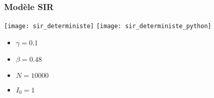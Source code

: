 \begin{frame}
        \frametitle{Modèle SIR}

		\centering

		\texttt{[image: sir\_deterministe]}
		\texttt{[image: sir\_deterministe\_python]}
		
        \begin{multicols}{2}
                \begin{itemize}
                        \item $\gamma = 0.1$
                        \item $\beta = 0.48$
                        \item $N = 10000$
                        \item $I_0 = 1$
                \end{itemize}
        \end{multicols}

\end{frame}



